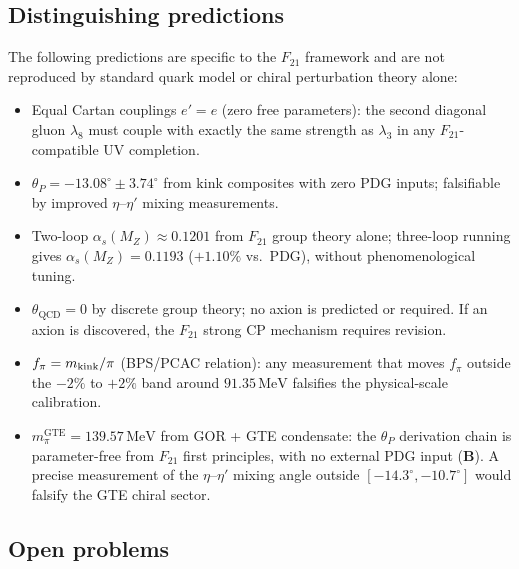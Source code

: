 \documentclass[11pt]{article}
\theoremstyle{remark}
\newcommand{\GTE}{\text{GTE}}
\newcommand{\QCD}{\text{QCD}}
\newcommand{\Ftwentyone}{F_{21}}
\newcommand{\CatB}{\textbf{B}}
\begin{document}
\subsection{Distinguishing predictions}
\label{ssec:distinguish}

The following predictions are specific to the $\Ftwentyone$ framework and are
not reproduced by standard quark model or chiral perturbation theory alone:
\begin{itemize}[leftmargin=2em]
\item Equal Cartan couplings $e' = e$ (zero free parameters): the second
  diagonal gluon $\lambda_8$ must couple with exactly the same strength as
  $\lambda_3$ in any $\Ftwentyone$-compatible UV completion.
\item $\theta_P = -13.08^\circ \pm 3.74^\circ$ from kink composites with
  zero PDG inputs; falsifiable by improved $\eta$--$\eta'$ mixing measurements.
\item Two-loop $\alpha_s(M_Z) \approx 0.1201$ from $\Ftwentyone$ group
  theory alone; three-loop running gives $\alpha_s(M_Z) = 0.1193$
  ($+1.10\%$ vs.\ PDG), without phenomenological tuning.
\item $\theta_{\QCD} = 0$ by discrete group theory; no axion is predicted or
  required.
  If an axion is discovered, the $\Ftwentyone$ strong CP mechanism requires
  revision.
\item $f_\pi = m_{\rm kink}/\pi$ (BPS/PCAC relation): any measurement that
  moves $f_\pi$ outside the $-2\%$ to $+2\%$ band around
  $91.35\,\mathrm{MeV}$ falsifies the physical-scale calibration.
\item $m_\pi^{\GTE} = 139.57\,\mathrm{MeV}$ from GOR + GTE condensate: the
  $\theta_P$ derivation chain is parameter-free from $\Ftwentyone$ first
  principles, with no external PDG input (\CatB).
  A precise measurement of the $\eta$--$\eta'$ mixing angle outside
  $[-14.3^\circ, -10.7^\circ]$ would falsify the GTE chiral sector.
\end{itemize}

\subsection{Open problems}
\label{ssec:open}
\end{document}
